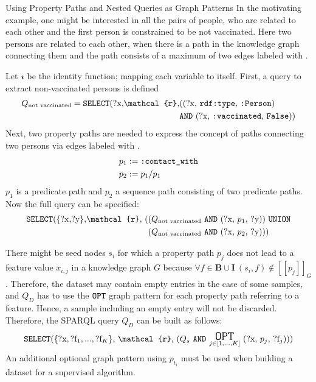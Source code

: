     \begin{Bsp}{Using Property Paths and Nested Queries as Graph Patterns}{}
    In the motivating example, one might be interested in all the pairs of people, who are related to each other and the first person is constrained to be not vaccinated. Here two persons are related to each other, when there is a path in the knowledge graph connecting them and the path consists of a maximum of two edges labeled with .
    
    Let $\mathcal{r}$ be the identity function; mapping each variable to itself.
    First, a query to extract non-vaccinated persons is defined 
    \begin{align*}
        Q_\text{not vaccinated} = \text{\uri{SELECT}(?x,$\mathcal{r}$,} & \text{((?x, \uri{rdf:type}, \uri{:Person})}\\ 
        & \text{\uri{AND} (?x, \uri{:vaccinated}, \uri{False}))}
    \end{align*} 
    Next, two property paths are needed to express the concept of paths connecting two persons via edges labeled with .
    \begin{align*}
        p_1 & := \texttt{:contact\_with} \\
        p_2 & := p_1 / p_1
    \end{align*}
    $p_1$ is a predicate path and $p_2$ a sequence path consisting of two predicate paths.
    Now the full query can be specified:
    \begin{align*}
        \text{\uri{SELECT}(\{?x,?y\},$\mathcal{r}$, (} & \text{($Q_\text{not vaccinated}$ \uri{AND} (?x, $p_1$, ?y)) \uri{UNION}}\\ 
        & \text{($Q_\text{not vaccinated}$ \uri{AND} (?x, $p_2$, ?y)))}
    \end{align*}
    \end{Bsp}
    
    There might be seed nodes $s_i$ for which a property path $p_j$ does not lead to a feature value $x_{i,j}$ in a knowledge graph $G$ because $\forall f \in \mathbf{B} \cup \mathbf{I} ~ (s_i, f) \not\in [[p_j]]_G$. Therefore, the dataset may contain empty entries in the case of some samples, and $Q_D$ has to use the $\texttt{OPT}$ graph pattern for each property path referring to a feature. Hence, a sample including an empty entry will not be discarded. Therefore, the SPARQL query $Q_D$ can be built as follows:
    \begin{align}
        \text{\uri{SELECT}(\{$\text{?x},\text{?f}_1,...,\text{?f}_K$\}, $\mathcal{r}$, ($Q_s$ \uri{AND} $\substack{\uri{\Large OPT}\\j \in [1,...,K]}$ (?x, $p_j$, $\text{?f}_j$)))} \label{datset_generating_query_pattern}
    \end{align}
    An additional optional graph pattern using $p_{t_i}$ must be used when building a dataset for a supervised algorithm.

